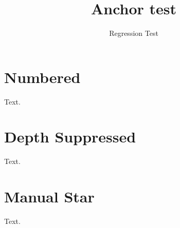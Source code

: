 \documentclass{e_class_noteShort}
\title{Anchor test}
\author{Regression Test}
\begin{document}
\tableofcontents
\section{Numbered}
Text.
\setcounter{secnumdepth}{0}
\section{Depth Suppressed}
Text.
\section*{Manual Star}
Text.
\end{document}
